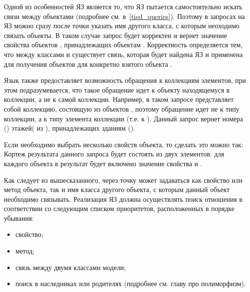 Одной из особенностей ЯЗ является то, что ЯЗ пытается самостоятельно искать связи между 
объектами (подробнее см. в~\ref{tied_queries}). Поэтому в запросах на ЯЗ можно
сразу после точки указать имя другого класса, с которым неоходимо связать объекты.
В таком случае запрос
будет корректен и вернет значение свойства  объектов ,
принадлежащих объектам . Корректность определяется тем, что между классами
 и  существует связь, которая будет найдена
ЯЗ и применена для получения объектов  для конкретно взятого
объекта .

Язык также предоставляет возможность обращения к коллекциям
элементов, при этом подразумевается, что такое обращение идет к объекту находящемуся в
коллекции, а не к самой коллекции.
Например, в таком запросе
 представляет собой коллекцию, состоящую из объектов , поэтому
обращение  идет не к типу коллекции, а к типу элемента коллекции (т.е. к ).
Данный запрос вернет номера () этажей( из ), принадлежащих зданиям 
().

Если необходимо выбрать несколько свойств объекта, то сделать это можно так:
Кортеж результата данного запроса будет состоять из двух элементов: для каждого объекта 
в результат будет включено значение свойства  и .

Как следует из вышесказанного, через точку может задаваться как свойство или метод объекта, так и
имя класса другого объекта, с которым данный объект необходимо связывать. Реализация ЯЗ
должна осуществлять поиск отношения в соответствии со следующим списком приоритетов, расположенных в
порядке убывания: 
\begin{itemize}\addtolength{\itemsep}{-0.7\baselineskip}
    \item свойство;
    \item метод;
    \item связь между двумя классами модели;
    \item поиск в наследниках или родителях (подробнее см. главу про полиморфизм).
\end{itemize}





